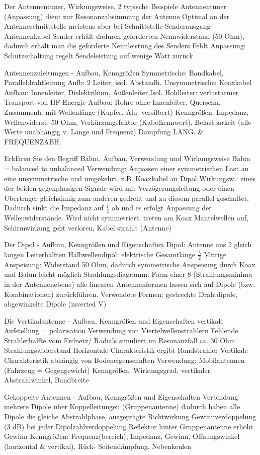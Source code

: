 \documentclass[avery5371,grid,frame,a4paper]{flashcards}
\newcommand{\card}[3]{
  \begin{flashcard}[{\chap} -- #1]{#2}#3\end{flashcard}
}
\begin{document}
\card{61}{Der Antennentuner, Wirkungsweise, 2 typische Beispiele}{
  Antennentuner (Anpassung) dient zur 
Resonanzabsimmung der Antenne
Optimal an der Antenneschnittstelle 
meistens aber bei Schnittstelle Senderausgang-
Antennenkabel
Sender erhält dadurch geforderten 
Nennwiderstand (50 Ohm), dadurch erhält man
die geforderte Nennleistung des Senders
Fehlt Anpassung: Schutzschaltung regelt 
Sendeleistung auf wenige Watt zurück
}
\card{62}{Antennenzuleitungen - Aufbau, Kenngrößen}{
  Symmetrische: Bandkabel, Paralleldrahtleitung
  Aufb: 2 Leiter, isol. Abstandh.
  Unsymmetrische: Koaxkabel
  Aufbau: Innenleiter, Dielektrikum, Außenleiter,Isol.
  Hohlleiter: verlustarmer Transport von HF Energie
  Aufbau: Rohre ohne Innenleiter, Querschn. 
  Zusammenh. mit Wellenlänge (Kupfer, Alu. versilbert)
  Kenngrößen: Impedanz, Wellenwiderst. 50 Ohm, Verkürzungsfaktor (Kabelkennwert), Belastbarkeit (alle Werte unabhängig v. Länge und Frequenz)
  Dämpfung LÄNG. \& FREQUENZABH.
}
\card{63}{Erklären Sie den Begriff Balun. Aufbau, Verwendung und Wirkungsweise}{
  Balun = balanced to unbalanced
Verwendung: Anpassen einer symmetrischen Last an eine unsymmetrische und umgekehrt, z.B. Koaxkabel an Dipol 
Wirkungsw.: eines der beiden gegenphasigen Signale wird mit Verzögerungsleitung oder einen Übertrager gleichsinnig zum anderen gedreht und zu diesem parallel geschaltet. Dadurch sinkt die Impedanz auf $\frac14$ ab und es erfolgt Anpassung der Wellenwiderstände.
Wird nicht symmetriert, treten am Koax Mantelwellen auf, Schirmwirkung geht verloren, Kabel strahlt (Antenne)
}
\card{64}{Der Dipol - Aufbau, Kenngrößen und Eigenschaften}{
  Dipol: Antenne aus 2  gleich langen Leiterhälften
  Halbwellendipol: elektrische Gesamtlänge $\frac\lambda2$
  Mittige Anspeisung: Widerstand 50 Ohm, dadurch 
symmetrische Anspeisung durch Koax und Balun 
leicht möglich
Strahlungsdiagramm: Form einer 8 (Strahlungsminima
 in der Antennenebene)
alle linearen Antennenformen lassen sich auf Dipole
(bzw. Kombinationen) zurückführen.
Verwendete Formen: gestreckte Drahtdipole,
abgewinkelte Dipole (inverted V)
}
\card{65}{Die Vertikalantenne - Aufbau, Kenngrößen und Eigenschaften}{
  vertikale Aufstellung = polarisation
Verwendung von Viertelwellenstrahlern
Fehlende Strahlerhälfte vom Erdnetz/ Radials
simuliert im Resonanzfall ca. 30 Ohm 
Strahlungswiderstand 
Horizontale Charakteristik ergibt Rundstrahler
Vertikale Charakteristik abhängig von
Bodeneigenschaften
Verwendung: Mobilantennen (Fahrzeug = Gegengewicht)
Kenngrößen: Wirkungsgrad, vertikaler Abstrahlwinkel,
Bandbreite
}
\card{66}{Gekoppelte Antennen - Aufbau, Kenngrößen und Eigenschaften}{
  Verbindung mehrere Dipole über Koppelleitungen
(Gruppenantenne)
dadurch haben alle Dipole die gleiche Abstrahlphase,
ausgeprägte Richtwirkung 
Gewinnverdoppelung (3 dB) bei jeder Dipolzahlverdoppelung
Reflektor hinter Gruppenantenne erhöht Gewinn
Kenngrößen: Frequenz(bereich), Impedanz, Gewinn, 
Öffnungswinkel (horizontal \& vertikal),
Rück- Seitendämpfung, Nebenkeulen
}
\end{document}
